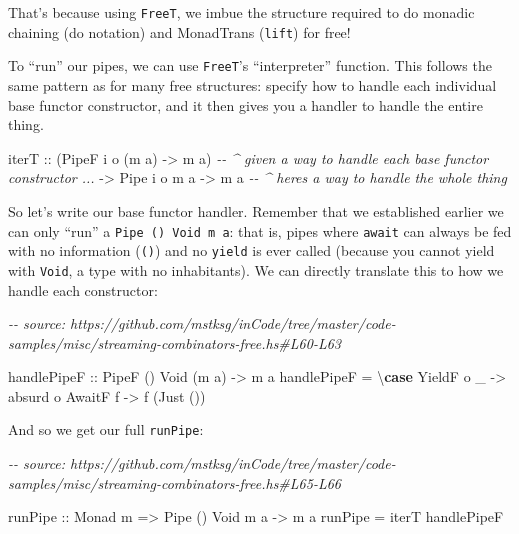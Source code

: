 \documentclass[]{article}
\newenvironment{Shaded}{}{}
\newcommand{\CommentTok}[1]{\textcolor[rgb]{0.38,0.63,0.69}{\textit{#1}}}
\newcommand{\DataTypeTok}[1]{\textcolor[rgb]{0.56,0.13,0.00}{#1}}
\newcommand{\KeywordTok}[1]{\textcolor[rgb]{0.00,0.44,0.13}{\textbf{#1}}}
\newcommand{\NormalTok}[1]{#1}
\newcommand{\OtherTok}[1]{\textcolor[rgb]{0.00,0.44,0.13}{#1}}
\begin{document}
That's because using \texttt{FreeT}, we imbue the structure required to do
monadic chaining (do notation) and MonadTrans (\texttt{lift}) for free!

To ``run'' our pipes, we can use \texttt{FreeT}'s ``interpreter'' function. This
follows the same pattern as for many free structures: specify how to handle each
individual base functor constructor, and it then gives you a handler to handle
the entire thing.

\begin{Shaded}
\begin{Highlighting}[]
\NormalTok{iterT}
\OtherTok{    ::}\NormalTok{ (}\DataTypeTok{PipeF}\NormalTok{ i o (m a) }\OtherTok{{-}>}\NormalTok{ m a)  }\CommentTok{{-}{-} \^{} given a way to handle each base functor constructor ...}
    \OtherTok{{-}>} \DataTypeTok{Pipe}\NormalTok{ i o m a }\OtherTok{{-}>}\NormalTok{ m a       }\CommentTok{{-}{-} \^{} here\textquotesingle{}s a way to handle the whole thing}
\end{Highlighting}
\end{Shaded}

So let's write our base functor handler. Remember that we established earlier we
can only ``run'' a \texttt{Pipe\ ()\ Void\ m\ a}: that is, pipes where
\texttt{await} can always be fed with no information (\texttt{()}) and no
\texttt{yield} is ever called (because you cannot yield with \texttt{Void}, a
type with no inhabitants). We can directly translate this to how we handle each
constructor:

\begin{Shaded}
\begin{Highlighting}[]
\CommentTok{{-}{-} source: https://github.com/mstksg/inCode/tree/master/code{-}samples/misc/streaming{-}combinators{-}free.hs\#L60{-}L63}

\OtherTok{handlePipeF ::} \DataTypeTok{PipeF}\NormalTok{ () }\DataTypeTok{Void}\NormalTok{ (m a) }\OtherTok{{-}>}\NormalTok{ m a}
\NormalTok{handlePipeF }\OtherTok{=}\NormalTok{ \textbackslash{}}\KeywordTok{case}
    \DataTypeTok{YieldF}\NormalTok{ o \_ }\OtherTok{{-}>}\NormalTok{ absurd o}
    \DataTypeTok{AwaitF}\NormalTok{ f   }\OtherTok{{-}>}\NormalTok{ f (}\DataTypeTok{Just}\NormalTok{ ())}
\end{Highlighting}
\end{Shaded}

And so we get our full \texttt{runPipe}:

\begin{Shaded}
\begin{Highlighting}[]
\CommentTok{{-}{-} source: https://github.com/mstksg/inCode/tree/master/code{-}samples/misc/streaming{-}combinators{-}free.hs\#L65{-}L66}

\OtherTok{runPipe ::} \DataTypeTok{Monad}\NormalTok{ m }\OtherTok{=>} \DataTypeTok{Pipe}\NormalTok{ () }\DataTypeTok{Void}\NormalTok{ m a }\OtherTok{{-}>}\NormalTok{ m a}
\NormalTok{runPipe }\OtherTok{=}\NormalTok{ iterT handlePipeF}
\end{Highlighting}
\end{Shaded}
\end{document}
